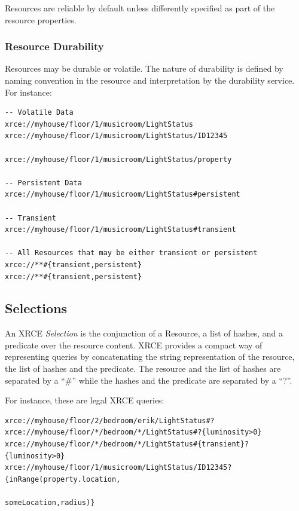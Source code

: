 \documentclass[a4paper,oneside,article]{memoir}
\begin{document}
Resources are reliable by default unless differently specified as part of the resource properties.

\subsubsection{Resource Durability}

Resources may be durable or volatile. The nature of durability is defined by naming convention in
the resource and interpretation by the durability service. For instance:

\begin{verbatim}
-- Volatile Data
xrce://myhouse/floor/1/musicroom/LightStatus 
xrce://myhouse/floor/1/musicroom/LightStatus/ID12345 

xrce://myhouse/floor/1/musicroom/LightStatus/property

-- Persistent Data
xrce://myhouse/floor/1/musicroom/LightStatus#persistent

-- Transient    
xrce://myhouse/floor/1/musicroom/LightStatus#transient

-- All Resources that may be either transient or persistent 
xrce://**#{transient,persistent}
xrce://**#{transient,persistent}
\end{verbatim}

\subsection{Selections}

An XRCE \emph{Selection} is the conjunction of a Resource, a list of hashes, and a predicate over
the resource content.  XRCE provides a compact way of representing queries by concatenating the
string representation of the resource, the list of hashes and the predicate.  The resource and the
list of hashes are separated by a ``\#'' while the hashes and the predicate are separated by a ``?''.

For instance, these are legal XRCE queries:
\begin{verbatim}
xrce://myhouse/floor/2/bedroom/erik/LightStatus#?
xrce://myhouse/floor/*/bedroom/*/LightStatus#?{luminosity>0}
xrce://myhouse/floor/*/bedroom/*/LightStatus#{transient}?{luminosity>0}
xrce://myhouse/floor/1/musicroom/LightStatus/ID12345?{inRange(property.location,
                                                              someLocation,radius)}
\end{verbatim}
\end{document}
